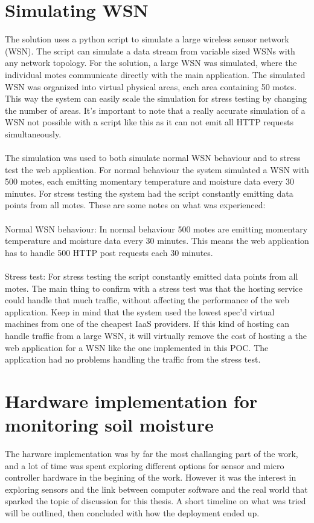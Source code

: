 \documentclass[]{uiophd}
\begin{document}
\section{Simulating WSN}
The solution uses a python script to simulate a large wireless sensor network (WSN). The script can simulate a data stream from variable sized WSNs with any network topology. For the solution, a large WSN was simulated, where the individual motes communicate directly with the main application. The simulated WSN was organized into virtual physical areas, each area containing 50 motes. This way the system can easily scale the simulation for stress testing by changing the number of areas. It’s important to note that a really accurate simulation of a WSN not possible with a script like this as it can not emit all HTTP requests simultaneously.
\\\\
The simulation was used to both simulate normal WSN behaviour and to stress test the web application. For normal behaviour the system simulated a WSN with 500 motes, each emitting momentary temperature and moisture data every 30 minutes. For stress testing the system had the script constantly emitting data points from all motes. These are some notes on what was experienced:
\\\\
Normal WSN behaviour: In normal behaviour 500 motes are emitting momentary temperature and moisture data every 30 minutes. This means the web application has to handle 500 HTTP post requests each 30 minutes.
\\\\
Stress test:  For stress testing the script constantly emitted data points from all motes. The main thing to confirm with a stress test was that the hosting service could handle that much traffic, without affecting the performance of the web application. Keep in mind that the system used the lowest spec’d virtual machines from one of the cheapest IaaS providers. If this kind of hosting can handle traffic from a large WSN, it will virtually remove the cost of hosting a the web application for a WSN like the one implemented in this POC. The application had no problems handling the traffic from the stress test.

  
\section{Hardware implementation for monitoring soil moisture}
The harware implementation was by far the most challanging part of the work, and a lot of time was spent exploring different options for sensor and micro controller hardware in the begining of the work. However it was the interest in exploring sensors and the link between computer software and the real world that sparked the topic of discussion for this thesis. A short timeline on what was tried will be outlined, then concluded with how the deployment ended up.
\end{document}
